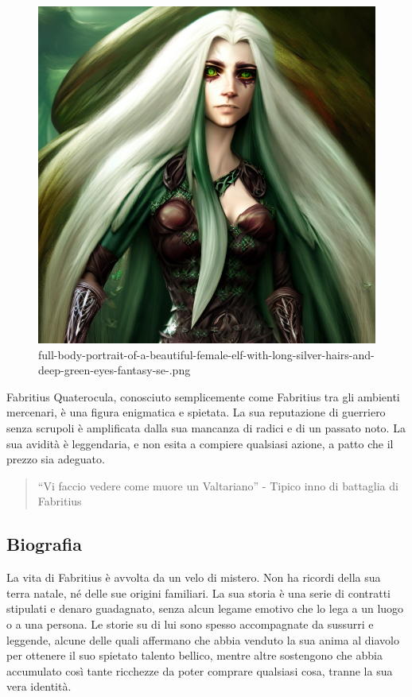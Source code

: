 \begin{figure}
\centering
\includegraphics{full-body-portrait-of-a-beautiful-female-elf-with-long-silver-hairs-and-deep-green-eyes-fantasy-se-.png}
\caption{full-body-portrait-of-a-beautiful-female-elf-with-long-silver-hairs-and-deep-green-eyes-fantasy-se-.png}
\end{figure}

Fabritius Quaterocula, conosciuto semplicemente come Fabritius tra gli
ambienti mercenari, è una figura enigmatica e spietata. La sua
reputazione di guerriero senza scrupoli è amplificata dalla sua mancanza
di radici e di un passato noto. La sua avidità è leggendaria, e non
esita a compiere qualsiasi azione, a patto che il prezzo sia adeguato.

\begin{quote}
``Vi faccio vedere come muore un Valtariano'' - Tipico inno di battaglia
di Fabritius
\end{quote}

\subsection{Biografia}\label{biografia}


La vita di Fabritius è avvolta da un velo di mistero. Non ha ricordi
della sua terra natale, né delle sue origini familiari. La sua storia è
una serie di contratti stipulati e denaro guadagnato, senza alcun legame
emotivo che lo lega a un luogo o a una persona. Le storie su di lui sono
spesso accompagnate da sussurri e leggende, alcune delle quali affermano
che abbia venduto la sua anima al diavolo per ottenere il suo spietato
talento bellico, mentre altre sostengono che abbia accumulato così tante
ricchezze da poter comprare qualsiasi cosa, tranne la sua vera identità.

